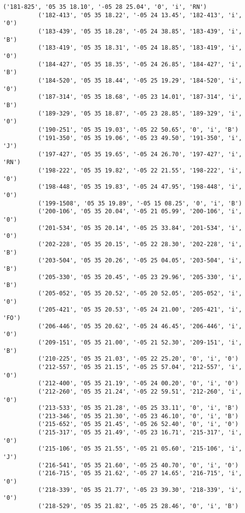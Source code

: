 \documentclass{article}
\begin{document}
\begin{Verbatim}[commandchars=\\\{\}]
          ('181-825', '05 35 18.10', '-05 28 25.04', '0', 'i', 'RN')
          ('182-413', '05 35 18.22', '-05 24 13.45', '182-413', 'i', '0')
          ('183-439', '05 35 18.28', '-05 24 38.85', '183-439', 'i', 'B')
          ('183-419', '05 35 18.31', '-05 24 18.85', '183-419', 'i', '0')
          ('184-427', '05 35 18.35', '-05 24 26.85', '184-427', 'i', 'B')
          ('184-520', '05 35 18.44', '-05 25 19.29', '184-520', 'i', '0')
          ('187-314', '05 35 18.68', '-05 23 14.01', '187-314', 'i', 'B')
          ('189-329', '05 35 18.87', '-05 23 28.85', '189-329', 'i', '0')
          ('190-251', '05 35 19.03', '-05 22 50.65', '0', 'i', 'B')
          ('191-350', '05 35 19.06', '-05 23 49.50', '191-350', 'i', 'J')
          ('197-427', '05 35 19.65', '-05 24 26.70', '197-427', 'i', 'RN')
          ('198-222', '05 35 19.82', '-05 22 21.55', '198-222', 'i', '0')
          ('198-448', '05 35 19.83', '-05 24 47.95', '198-448', 'i', '0')
          ('199-1508', '05 35 19.89', '-05 15 08.25', '0', 'i', 'B')
          ('200-106', '05 35 20.04', '-05 21 05.99', '200-106', 'i', '0')
          ('201-534', '05 35 20.14', '-05 25 33.84', '201-534', 'i', '0')
          ('202-228', '05 35 20.15', '-05 22 28.30', '202-228', 'i', 'B')
          ('203-504', '05 35 20.26', '-05 25 04.05', '203-504', 'i', 'B')
          ('205-330', '05 35 20.45', '-05 23 29.96', '205-330', 'i', 'B')
          ('205-052', '05 35 20.52', '-05 20 52.05', '205-052', 'i', '0')
          ('205-421', '05 35 20.53', '-05 24 21.00', '205-421', 'i', 'FO')
          ('206-446', '05 35 20.62', '-05 24 46.45', '206-446', 'i', '0')
          ('209-151', '05 35 21.00', '-05 21 52.30', '209-151', 'i', 'B')
          ('210-225', '05 35 21.03', '-05 22 25.20', '0', 'i', '0')
          ('212-557', '05 35 21.15', '-05 25 57.04', '212-557', 'i', '0')
          ('212-400', '05 35 21.19', '-05 24 00.20', '0', 'i', '0')
          ('212-260', '05 35 21.24', '-05 22 59.51', '212-260', 'i', '0')
          ('213-533', '05 35 21.28', '-05 25 33.11', '0', 'i', 'B')
          ('213-346', '05 35 21.30', '-05 23 46.10', '0', 'i', 'B')
          ('215-652', '05 35 21.45', '-05 26 52.40', '0', 'i', '0')
          ('215-317', '05 35 21.49', '-05 23 16.71', '215-317', 'i', '0')
          ('215-106', '05 35 21.55', '-05 21 05.60', '215-106', 'i', 'J')
          ('216-541', '05 35 21.60', '-05 25 40.70', '0', 'i', '0')
          ('216-715', '05 35 21.62', '-05 27 14.65', '216-715', 'i', '0')
          ('218-339', '05 35 21.77', '-05 23 39.30', '218-339', 'i', '0')
          ('218-529', '05 35 21.82', '-05 25 28.46', '0', 'i', 'B')

\end{Verbatim}
\end{document}
